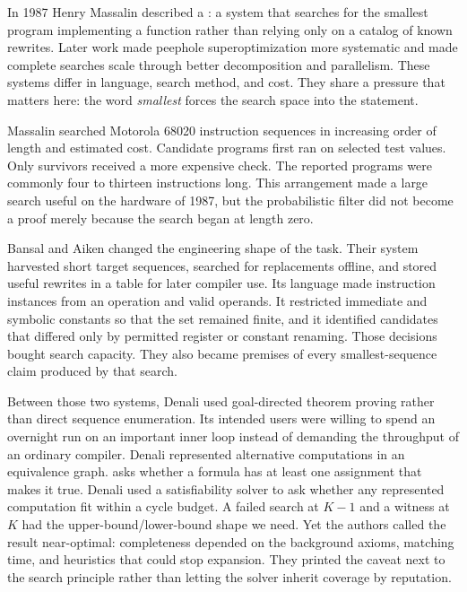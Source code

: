 In 1987 Henry Massalin described a : a system that
searches for the smallest program implementing a function rather than relying
only on a catalog of known rewrites.\autocite{massalin1987} Later work made
peephole superoptimization more systematic and made complete searches scale
through better decomposition and parallelism.\autocite{bansalaiken2006,lubodik2025}
These systems differ in language, search method, and cost. They share a
pressure that matters here: the word \emph{smallest} forces the search space
into the statement.

Massalin searched Motorola 68020 instruction sequences in increasing order of
length and estimated cost. Candidate programs first ran on selected test
values. Only survivors received a more expensive check. The reported programs
were commonly four to thirteen instructions long. This arrangement made a
large search useful on the hardware of 1987, but the probabilistic filter did
not become a proof merely because the search began at length zero.

Bansal and Aiken changed the engineering shape of the task. Their system
harvested short target sequences, searched for replacements offline, and
stored useful rewrites in a table for later compiler use. Its language made
instruction instances from an operation and valid operands. It restricted
immediate and symbolic constants so that the set remained finite, and it
identified candidates that differed only by permitted register or constant
renaming. Those decisions bought search capacity. They also became premises
of every smallest-sequence claim produced by that search.

Between those two systems, Denali used goal-directed theorem proving rather
than direct sequence enumeration. Its intended users were willing to spend an
overnight run on an important inner loop instead of demanding the throughput
of an ordinary compiler. Denali represented alternative computations in an
equivalence graph.  asks whether a formula has at least
one assignment that makes it true. Denali used a satisfiability solver to ask
whether any represented computation fit within a cycle budget. A failed search
at \(K-1\) and a witness
at \(K\) had the upper-bound/lower-bound shape we need. Yet the authors called
the result near-optimal: completeness depended on the background axioms,
matching time, and heuristics that could stop expansion. They printed the
caveat next to the search principle rather than letting the solver inherit
coverage by reputation.\autocite{joshinelsonrandall2002}

